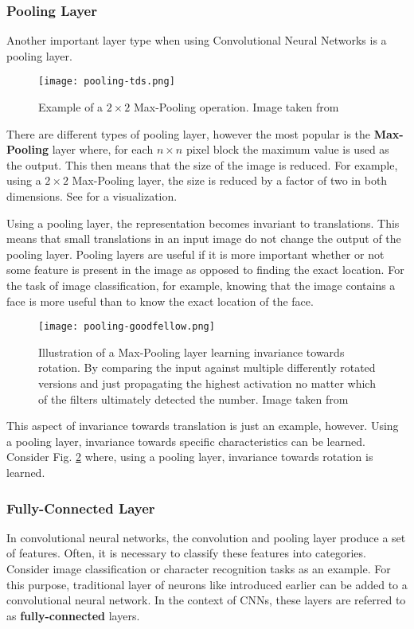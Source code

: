 




\subsubsection{Pooling Layer}
Another important layer type when using Convolutional Neural Networks is a pooling layer.

\begin{figure}[htb!]
    \centering
    \texttt{[image: pooling-tds.png]}
    \caption{Example of a $2 \times 2$ Max-Pooling operation. Image taken from \cite{cornelisse_intuitive_2018}}
    \label{fig:pooling-tds}
\end{figure}

There are different types of pooling layer, however the most popular is the \textbf{Max-Pooling} layer where, for each $n \times n$ pixel block the maximum value is used as the output.
This then means that the size of the image is reduced.
For example, using a $2 \times 2$ Max-Pooling layer, the size is reduced by a factor of two in both dimensions.
See  for a visualization.

Using a pooling layer, the representation becomes invariant to translations.
This means that small translations in an input image do not change the output of the pooling layer.
Pooling layers are useful if it is more important whether or not some feature is present in the image as opposed to finding the exact location.
For the task of image classification, for example, knowing that the image contains a face is more useful than to know the exact location of the face.

\begin{figure}[htb!]
    \centering
    \texttt{[image: pooling-goodfellow.png]}
    \caption{Illustration of a Max-Pooling layer learning invariance towards rotation. By comparing the input against multiple differently rotated versions and just propagating the highest activation no matter which of the filters ultimately detected the number. Image taken from \cite{goodfellow_deep_2016}}
    \label{fig:pooling-goodfellow}
\end{figure}

This aspect of invariance towards translation is just an example, however.
Using a pooling layer, invariance towards specific characteristics can be learned.
Consider Fig. \ref{fig:pooling-goodfellow} where, using a pooling layer, invariance towards rotation is learned.

\subsubsection{Fully-Connected Layer}
In convolutional neural networks, the convolution and pooling layer produce a set of features.
Often, it is necessary to classify these features into categories.
Consider image classification or character recognition tasks as an example.
For this purpose, traditional layer of neurons like introduced earlier can be added to a convolutional neural network.
In the context of CNNs, these layers are referred to as \textbf{fully-connected} layers.
